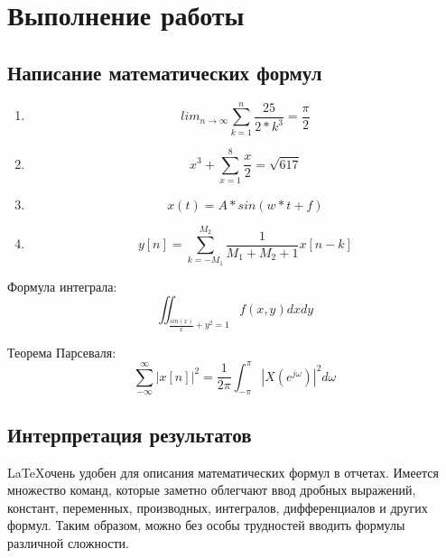 \documentclass[10pt,a4paper]{report}
\begin{document}
\chapter{Выполнение работы}
\section{Написание математических формул}

\begin{enumerate}

\item
\begin{displaymath}
	lim_{n \to \infty}
	\sum_{k=1}^n \frac{25}{2*k^3} = \frac{\pi}{2}
\end{displaymath}
	
\item 
\begin{displaymath}
	x^{3}+\sum_{x=1}^8 \frac{x}{2}= \sqrt{617}
\end{displaymath}

\item 
\begin{displaymath}
	x(t) = A * sin(w*t+f)
\end{displaymath}

\item
\begin{displaymath}
	y[n]= \sum_{k=-M_{1}}^{M_{2}}\frac{1}{M_{1}+M_{2}+1}x[n-k]
\end{displaymath}

\end{enumerate}

Формула интеграла:
\begin{displaymath}
	\iint_{\frac{sin(x)}{x}+y^{2} = 1} f(x, y) dx dy 
\end{displaymath}

Теорема Парсеваля:
\begin{displaymath}
	\sum_{-\infty}^{\infty}|x[n]|^{2}=\frac{1}{2\pi}\int_{-\pi}^{\pi}|X(e^{j\omega})|^{2}d\omega
\end{displaymath}


\section{Интерпретация результатов}
\LaTeX очень удобен для описания математических формул в отчетах. Имеется множество команд, которые заметно облегчают ввод дробных выражений, констант, переменных, производных, интегралов, дифференциалов и других формул. Таким образом, можно без особы трудностей вводить формулы различной сложности.
\end{document}
